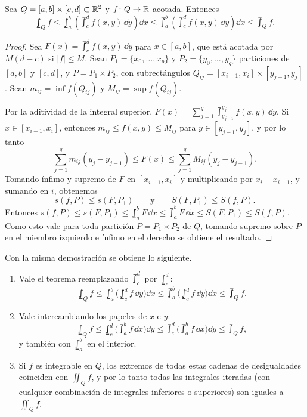 \begin{theorem}
  Sea \(Q = [a, b] \times [c, d] \subset \mathbb{R}^2\) y \(f\colon Q \to \mathbb{R}\) acotada. Entonces
  \[
    \lowint_Q f \leq \lowint_a^b \left( \upint_c^d f(x, y) \,\dd y \right) \dd x \leq \upint_a^b \left( \upint_c^d f(x, y) \,\dd y \right) \dd x \leq \upint_Q f.
  \]
\end{theorem}

\begin{proof}
  Sea \(F(x) = \upint_c^d f(x, y) \,\dd y\) para \(x \in [a, b]\), que está acotada por \(M(d - c)\) si \(|f| \leq M\). Sean \(P_1 = \{ x_0, \dots, x_p \}\) y \(P_2 = \{ y_0, \dots, y_q \}\) particiones de \([a, b]\) y \([c, d]\), y \(P = P_1 \times P_2\), con subrectángulos \(Q_{ij} = [x_{i-1}, x_i] \times [y_{j-1}, y_j]\). Sean \(m_{ij} = \inf f(Q_{ij})\) y \(M_{ij} = \sup f(Q_{ij})\).

  Por la aditividad de la integral superior, \(F(x) = \sum_{j=1}^{q} \upint_{y_{j-1}}^{y_j} f(x, y) \,\dd y\). Si \(x \in [x_{i-1}, x_i]\), entonces \(m_{ij} \leq f(x, y) \leq M_{ij}\) para \(y \in [y_{j-1}, y_j]\), y por lo tanto
  \[
    \sum_{j=1}^{q} m_{ij} (y_j - y_{j-1}) \leq F(x) \leq \sum_{j=1}^{q} M_{ij} (y_j - y_{j-1}).
  \]
  Tomando ínfimo y supremo de \(F\) en \([x_{i-1}, x_i]\) y multiplicando por \(x_i - x_{i-1}\), y sumando en \(i\), obtenemos
  \[
    s(f, P) \leq s(F, P_1) \qquad \text{y} \qquad S(F, P_1) \leq S(f, P).
  \]
  Entonces \(s(f, P) \leq s(F, P_1) \leq \lowint_a^b F \,\dd x \leq \upint_a^b F \,\dd x \leq S(F, P_1) \leq S(f, P)\). Como esto vale para toda partición \(P = P_1 \times P_2\) de \(Q\), tomando supremo sobre \(P\) en el miembro izquierdo e ínfimo en el derecho se obtiene el resultado.
\end{proof}

\begin{note}
  Con la misma demostración se obtiene lo siguiente.
  \begin{enumerate}[label=(\arabic*)]
    \item Vale el teorema reemplazando \(\upint_c^d\) por \(\lowint_c^d\):
          \[
            \lowint_Q f \leq \lowint_a^b \bigl( \lowint_c^d f \,\dd y \bigr) \dd x \leq \upint_a^b \bigl( \lowint_c^d f \,\dd y \bigr) \dd x \leq \upint_Q f.
          \]
    \item Vale intercambiando los papeles de \(x\) e \(y\):
          \[
            \lowint_Q f \leq \lowint_c^d \bigl( \upint_a^b f \,\dd x \bigr) \dd y \leq \upint_c^d \bigl( \upint_a^b f \,\dd x \bigr) \dd y \leq \upint_Q f,
          \]
          y también con \(\lowint_a^b\) en el interior.
    \item Si \(f\) es integrable en \(Q\), los extremos de todas estas cadenas de desigualdades coinciden con \(\iint_Q f\), y por lo tanto todas las integrales iteradas (con cualquier combinación de integrales inferiores o superiores) son iguales a \(\iint_Q f\).
  \end{enumerate}
\end{note}

